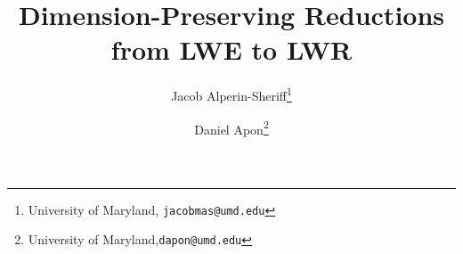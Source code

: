 \documentclass[letterpaper,11pt]{article}
\title{Dimension-Preserving Reductions from LWE to LWR}
\author{%
  Jacob Alperin-Sheriff\footnote{University of Maryland,
    \texttt{jacobmas@umd.edu}}
%
\and Daniel Apon\footnote{University of Maryland,\texttt{dapon@umd.edu}}
}
\begin{document}

\maketitle
\thispagestyle{empty}
\begin{abstract}
  \noteswarning
  

\end{abstract}


\clearpage
{} 









\end{document}

